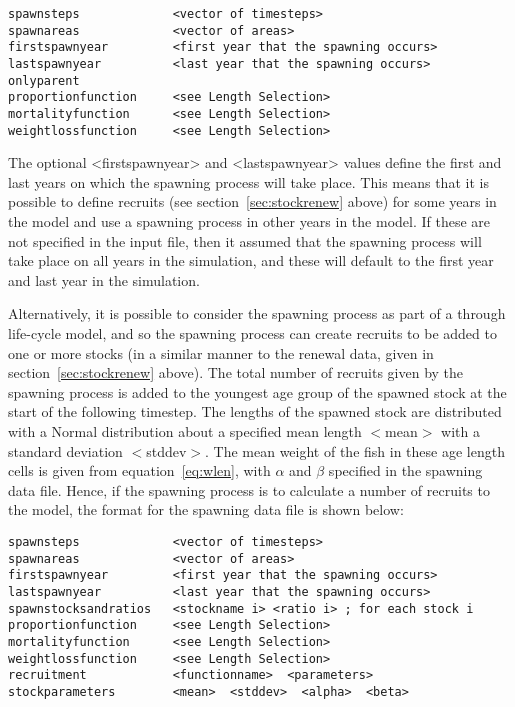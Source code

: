 \documentclass[10pt,twoside]{book}
\begin{document}
{\small\begin{verbatim}
spawnsteps             <vector of timesteps>
spawnareas             <vector of areas>
firstspawnyear         <first year that the spawning occurs>
lastspawnyear          <last year that the spawning occurs>
onlyparent
proportionfunction     <see Length Selection>
mortalityfunction      <see Length Selection>
weightlossfunction     <see Length Selection>
\end{verbatim}}

The optional <firstspawnyear> and <lastspawnyear> values define the first and last years on which the spawning process will take place.  This means that it is possible to define recruits (see section~\ref{sec:stockrenew} above) for some years in the model and use a spawning process in other years in the model.  If these are not specified in the input file, then it assumed that the spawning process will take place on all years in the simulation, and these will default to the first year and last year in the simulation.

\bigskip
Alternatively, it is possible to consider the spawning process as part of a through life-cycle model, and so the spawning process can create recruits to be added to one or more stocks (in a similar manner to the renewal data, given in section~\ref{sec:stockrenew} above).  The total number of recruits given by the spawning process is added to the youngest age group of the spawned stock at the start of the following timestep.  The lengths of the spawned stock are distributed with a Normal distribution about a specified mean length $<$mean$>$ with a standard deviation $<$stddev$>$.  The mean weight of the fish in these age length cells is given from equation~\ref{eq:wlen}, with $\alpha$ and $\beta$ specified in the spawning data file.  Hence, if the spawning process is to calculate a number of recruits to the model, the format for the spawning data file is shown below:

{\small\begin{verbatim}
spawnsteps             <vector of timesteps>
spawnareas             <vector of areas>
firstspawnyear         <first year that the spawning occurs>
lastspawnyear          <last year that the spawning occurs>
spawnstocksandratios   <stockname i> <ratio i> ; for each stock i
proportionfunction     <see Length Selection>
mortalityfunction      <see Length Selection>
weightlossfunction     <see Length Selection>
recruitment            <functionname>  <parameters>
stockparameters        <mean>  <stddev>  <alpha>  <beta>
\end{verbatim}}
\end{document}
